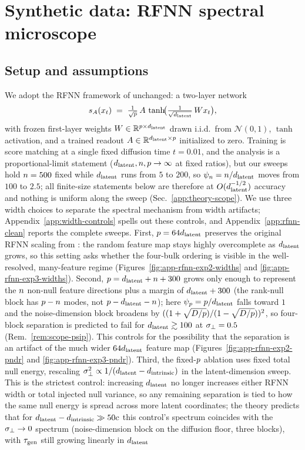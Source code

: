 \section{Synthetic data: RFNN spectral microscope}
\label{sec:rfnn}

\subsection{Setup and assumptions}
\label{sec:rfnn-setup}

We adopt the RFNN framework of \citet{bonnaire2025} unchanged: a two-layer network
\begin{equation}
  s_A(x_t) \;=\; \tfrac{1}{\sqrt{p}}\,A\,
  \tanh\!\bigl(\tfrac{1}{\sqrt{d_{\mathrm{latent}}}}\,W x_t\bigr),
  \label{eq:rfnn}
\end{equation}
with frozen first-layer weights $W \in \mathbb{R}^{p \times d_{\mathrm{latent}}}$ drawn i.i.d.\ from $\mathcal{N}(0, 1)$, $\tanh$ activation, and a trained readout $A \in \mathbb{R}^{d_{\mathrm{latent}} \times p}$ initialized to zero. Training is score matching at a single fixed diffusion time $t = 0.01$, and the analysis is a proportional-limit statement ($d_{\mathrm{latent}},n,p\to\infty$ at fixed ratios), but our sweeps hold $n=500$ fixed while $d_{\mathrm{latent}}$ runs from $5$ to $200$, so $\psi_n=n/d_{\mathrm{latent}}$ moves from $100$ to $2.5$; all finite-size statements below are therefore at $O(d_{\mathrm{latent}}^{-1/2})$ accuracy and nothing is uniform along the sweep (Sec.~\ref{app:theory-scope}). We use three width choices to separate the spectral mechanism from width artifacts; Appendix~\ref{app:width-controls} spells out these controls, and Appendix~\ref{app:rfnn-clean} reports the complete sweeps. First, $p=64d_{\mathrm{latent}}$ preserves the original RFNN scaling from \citet{bonnaire2025}: the random feature map stays highly overcomplete as $d_{\mathrm{latent}}$ grows, so this setting asks whether the four-bulk ordering is visible in the well-resolved, many-feature regime (Figures~\ref{fig:app-rfnn-exp2-widths} and \ref{fig:app-rfnn-exp3-widths}). Second, $p=d_{\mathrm{latent}}+n+300$ grows only enough to represent the $n$ non-null feature directions plus a margin of $d_{\mathrm{latent}}+300$ (the rank-null block has $p-n$ modes, not $p-d_{\mathrm{latent}}-n$); here $\psi_p=p/d_{\mathrm{latent}}$ falls toward $1$ and the noise-dimension block broadens by $((1+\sqrt{D/p})/(1-\sqrt{D/p}))^2$, so four-block separation is predicted to fail for $d_{\mathrm{latent}}\gtrsim100$ at $\sigma_{\perp}=0.5$ (Rem.~\ref{rem:scope-psip}). This controls for the possibility that the separation is an artifact of the much wider $64d_{\mathrm{latent}}$ feature map (Figures~\ref{fig:app-rfnn-exp2-pndr} and \ref{fig:app-rfnn-exp3-pndr}). Third, the fixed-$p$ ablation uses fixed total null energy, rescaling $\sigma_\perp^2\propto 1/(d_{\mathrm{latent}}-d_{\mathrm{intrinsic}})$ in the latent-dimension sweep. This is the strictest control: increasing $d_{\mathrm{latent}}$ no longer increases either RFNN width or total injected null variance, so any remaining separation is tied to how the same null energy is spread across more latent coordinates; the theory predicts that for $d_{\mathrm{latent}}-d_{\mathrm{intrinsic}}\gg 50c$ this control's spectrum coincides with the $\sigma_{\perp}\to0$ spectrum (noise-dimension block on the diffusion floor, three blocks), with $\tau_{\mathrm{gen}}$ still growing linearly in $d_{\mathrm{latent}}$ 